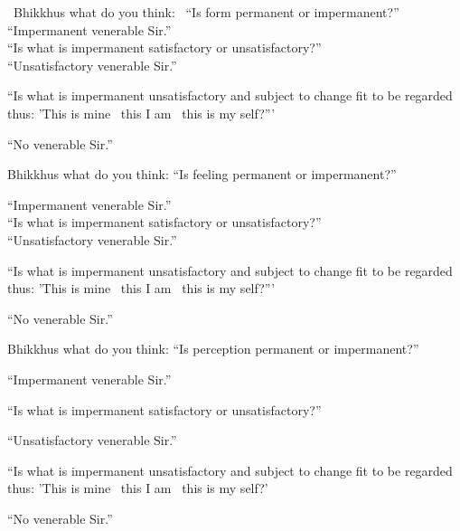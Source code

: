 \begin{english-only-nohang}
  \anglebracketleft\ \hspace{-0.5mm}Bhikkhus what do you think: \hspace{-0.5mm}\anglebracketright\ ``Is form permanent or impermanent?''\\

  ``Impermanent venerable Sir.''\\

  ``Is what is impermanent satisfactory or unsatisfactory?''\\

  ``Unsatisfactory venerable Sir.''\\

  \begin{english-hangtogether}
    ``Is what is impermanent unsatisfactory and subject to change fit to be regarded thus: 'This is mine \breathmark\ this I am \breathmark\ this is my self?'''
  \end{english-hangtogether}

  ``No venerable Sir.''
\end{english-only-nohang}

\begin{english-only-nohang}
  Bhikkhus what do you think: ``Is feeling permanent or impermanent?''

  ``Impermanent venerable Sir.''\\

  ``Is what is impermanent satisfactory or unsatisfactory?''\\

  ``Unsatisfactory venerable Sir.''\\

  \begin{english-hangtogether}
    ``Is what is impermanent unsatisfactory and subject to change fit to be regarded thus: 'This is mine \breathmark\ this I am \breathmark\ this is my self?'''
  \end{english-hangtogether}

  ``No venerable Sir.''
\end{english-only-nohang}

\begin{english-only-nohang}
  Bhikkhus what do you think: ``Is perception permanent or impermanent?''

  ``Impermanent venerable Sir.''

  ``Is what is impermanent satisfactory or unsatisfactory?''

  ``Unsatisfactory venerable Sir.''

  \begin{english-hangtogether}
    ``Is what is impermanent unsatisfactory and subject to change fit to be regarded thus: 'This is mine \breathmark\ this I am \breathmark\ this is my self?'
  \end{english-hangtogether}

  ``No venerable Sir.''
\end{english-only-nohang}

